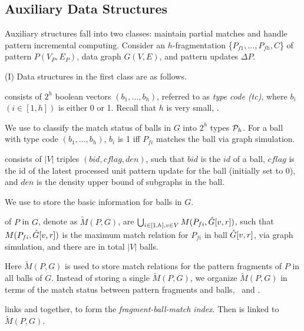 \subsection{Auxiliary Data Structures}
\label{subsec-auxstr}

Auxiliary structures fall into two classes:
maintain partial matches and handle pattern incremental computing. Consider an $h$-fragmentation \{$P_{f1}, \ldots, P_{fh}, C$\} of pattern $P(V_P, E_P)$, data graph $G(V, E)$, and pattern updates $\Delta P$.

\vspace{0.5ex}
(I) Data structures in the first class are as follows.

 consists of $2^h$ boolean vectors $(b_1,\ldots,b_h)$, referred to as {\em type code (tc)}, where $b_i$ $(i\in [1,h])$ is either 0 or 1. Recall that $h$ is very small, .

We use \fs to classify the match status of balls in $G$ into $2^h$ types \wrt ${\cal P}_h$.
For a ball with type code $(b_1,\ldots,b_h)$, $b_i$ is 1 iff $P_{fi}$ matches the ball via graph simulation.

\vspace{0.4ex}
 consists of $|V|$ triples $(bid, cflag, den)$, such that $bid$ is the $id$ of a ball,
$cflag$ is the id of the latest processed unit pattern update for the ball (initially set to $0$),
and $den$ is the density upper bound of subgraphs in the ball.

We use \bs to store the basic information for balls in $G$.

\vspace{0.4ex}
 of $P$ in $G$, denote as $\tilde{M}(P,G)$,
are $\bigcup_{i\in[1,h], v\in V} M(P_{fi},\hat{G}{[v,r]})$,
such that $M(P_{fi},\hat{G}{[v,r]})$ is the maximum match relation for $P_{fi}$ in ball $\hat{G}{[v,r]}$, via graph simulation,
and there are in total $|V|$ balls.

Here $\tilde{M}(P,G)$ is used to store match relations for the pattern fragments of $P$ in all balls of $G$. Instead of storing a single $\tilde{M}(P, G)$, we organize $\tilde{M}(P, G)$ in terms of the match status between pattern fragments and balls, \ie\ \fs and \bs.

\vspace{0.4ex}
 links \fs and \bs together, to form the {\em fragment-ball-match index}. Then \fb is linked to $\tilde{M}(P,G)$. 

